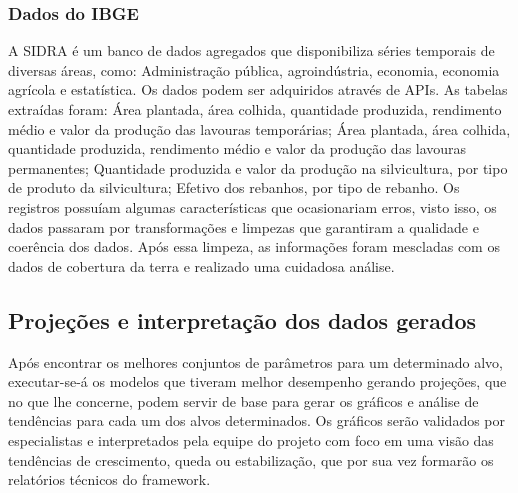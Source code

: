 \subsubsection{Dados do IBGE}

A SIDRA é um banco de dados agregados que disponibiliza séries temporais de diversas áreas, como: Administração pública, agroindústria, economia, economia agrícola e estatística. Os dados podem ser adquiridos através de APIs. As tabelas extraídas foram: Área plantada, área colhida, quantidade produzida, rendimento médio e valor da produção das lavouras temporárias; Área plantada, área colhida, quantidade produzida, rendimento médio e valor da produção das lavouras permanentes; Quantidade produzida e valor da produção na silvicultura, por tipo de produto da silvicultura; Efetivo dos rebanhos, por tipo de rebanho. Os registros possuíam algumas características que ocasionariam erros, visto isso, os dados passaram por transformações e limpezas que garantiram a qualidade e coerência dos dados. Após essa limpeza, as informações foram mescladas com os dados de cobertura da terra e realizado uma cuidadosa análise. 

\subsection{Projeções e interpretação dos dados gerados}

Após encontrar os melhores conjuntos de parâmetros para um determinado alvo, executar-se-á os modelos que tiveram melhor desempenho gerando
projeções, que no que lhe concerne, podem servir de base para gerar os gráficos e análise de tendências para cada um dos alvos determinados.
Os gráficos serão validados por especialistas e interpretados pela equipe do projeto com foco em uma visão das tendências de crescimento, queda ou
estabilização, que por sua vez formarão os relatórios técnicos do framework.

